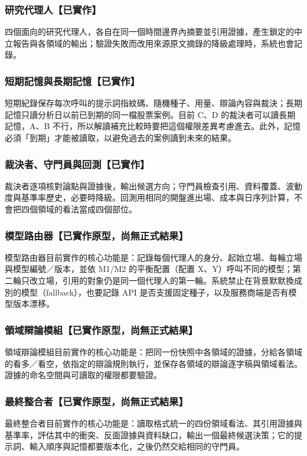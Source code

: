 \subsubsection{研究代理人【已實作】}
四個面向的研究代理人，各自在同一個時間邊界內摘要並引用證據，產生鎖定的中立報告與各領域的輸出；驗證失敗而改用來源原文摘錄的降級處理時，系統也會記錄。

\subsubsection{短期記憶與長期記憶【已實作】}
短期紀錄保存每次呼叫的提示詞指紋碼、隨機種子、用量、辯論內容與裁決；長期記憶只讀分析日以前已到期的同一檔股票案例。目前 C、D 的裁決者可以讀長期記憶，A、B 不行，所以解讀補充比較時要把這個權限差異考慮進去。此外，記憶必須「到期」才能被讀取，以避免過去的案例讀到未來的結果。

\subsubsection{裁決者、守門員與回測【已實作】}
裁決者逐項核對論點與證據後，輸出候選方向；守門員檢查引用、資料覆蓋、波動度與基準率歷史，必要時降級。回測用相同的開盤進出場、成本與日序列計算，不會把四個領域的看法當成四個部位。

\subsubsection{模型路由器【已實作原型，尚無正式結果】}
模型路由器目前實作的核心功能是：記錄每個代理人的身分、起始立場、每輪立場與模型編號／版本，並依 M1/M2 的平衡配置（配置 X、Y）呼叫不同的模型；第二輪只改立場，引用的對象仍是同一個代理人的第一輪。系統禁止在背景默默換成別的模型（fallback），也要記錄 API 是否支援固定種子，以及服務商端是否有模型版本漂移。

\subsubsection{領域辯論模組【已實作原型，尚無正式結果】}
領域辯論模組目前實作的核心功能是：把同一份快照中各領域的證據，分給各領域的看多／看空，依指定的辯論規則執行，並保存各領域的辯論逐字稿與領域看法。證據的命名空間與可讀取的權限都要驗證。

\subsubsection{最終整合者【已實作原型，尚無正式結果】}
最終整合者目前實作的核心功能是：讀取格式統一的四份領域看法、其引用證據與基準率，評估其中的衝突、反面證據與資料缺口，輸出一個最終候選決策；它的提示詞、輸入順序與記憶都要版本化，之後仍然交給相同的守門員。

